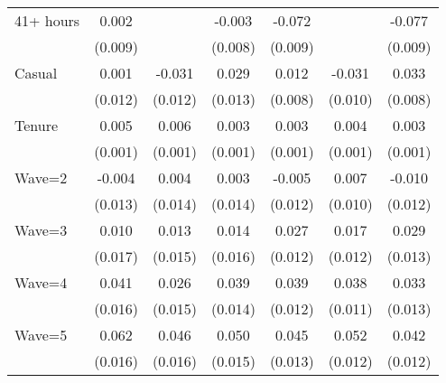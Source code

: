{\begin{tabular}{l*{6}{c}}
41+ hours           &       0.002         &                     &      -0.003         &      -0.072\sym{***}&                     &      -0.077\sym{***}\\
                    &     (0.009)         &                     &     (0.008)         &     (0.009)         &                     &     (0.009)         \\
Casual              &       0.001         &      -0.031\sym{**} &       0.029\sym{**} &       0.012         &      -0.031\sym{***}&       0.033\sym{***}\\
                    &     (0.012)         &     (0.012)         &     (0.013)         &     (0.008)         &     (0.010)         &     (0.008)         \\
Tenure              &       0.005\sym{***}&       0.006\sym{***}&       0.003\sym{***}&       0.003\sym{***}&       0.004\sym{***}&       0.003\sym{***}\\
                    &     (0.001)         &     (0.001)         &     (0.001)         &     (0.001)         &     (0.001)         &     (0.001)         \\
Wave=2              &      -0.004         &       0.004         &       0.003         &      -0.005         &       0.007         &      -0.010         \\
                    &     (0.013)         &     (0.014)         &     (0.014)         &     (0.012)         &     (0.010)         &     (0.012)         \\
Wave=3              &       0.010         &       0.013         &       0.014         &       0.027\sym{**} &       0.017         &       0.029\sym{**} \\
                    &     (0.017)         &     (0.015)         &     (0.016)         &     (0.012)         &     (0.012)         &     (0.013)         \\
Wave=4              &       0.041\sym{***}&       0.026\sym{*}  &       0.039\sym{***}&       0.039\sym{***}&       0.038\sym{***}&       0.033\sym{***}\\
                    &     (0.016)         &     (0.015)         &     (0.014)         &     (0.012)         &     (0.011)         &     (0.013)         \\
Wave=5              &       0.062\sym{***}&       0.046\sym{***}&       0.050\sym{***}&       0.045\sym{***}&       0.052\sym{***}&       0.042\sym{***}\\
                    &     (0.016)         &     (0.016)         &     (0.015)         &     (0.013)         &     (0.012)         &     (0.012)         \\

\end{tabular}}
